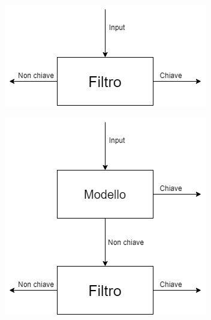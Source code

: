 \documentclass[../../main.tex]{subfiles}
\begin{document}
    \begin{figure}[H]
        \centering
        \begin{subfigure}[c]{0.3\textwidth}
            \includegraphics[width=\textwidth]{immagini/5_2/bloomFilter.png}
            \caption{}
            \label{fig:appartenenzaBF}
        \end{subfigure}
        \begin{subfigure}[c]{0.3\textwidth}
            \includegraphics[width=\textwidth]{immagini/5_2/LBF.png}
            \caption{}
            \label{fig:appartenenzaLBF}
        \end{subfigure}
        \begin{subfigure}[c]{0.3\textwidth}

\end{subfigure}
\end{figure}
\end{document}

